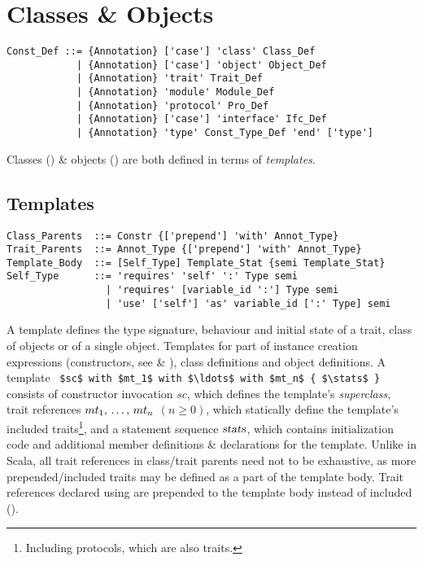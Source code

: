 
\chapter{Classes \& Objects}

\syntax\begin{lstlisting}
Const_Def ::= {Annotation} ['case'] 'class' Class_Def
            | {Annotation} ['case'] 'object' Object_Def
            | {Annotation} 'trait' Trait_Def
            | {Annotation} 'module' Module_Def
            | {Annotation} 'protocol' Pro_Def
            | {Annotation} ['case'] 'interface' Ifc_Def
            | {Annotation} 'type' Const_Type_Def 'end' ['type']
\end{lstlisting}

Classes () \& objects () are both defined in terms of {\em templates}. 





\section{Templates}
\label{sec:templates}

\syntax\begin{lstlisting}
Class_Parents  ::= Constr {['prepend'] 'with' Annot_Type} 
Trait_Parents  ::= Annot_Type {['prepend'] 'with' Annot_Type}
Template_Body  ::= [Self_Type] Template_Stat {semi Template_Stat}
Self_Type      ::= 'requires' 'self' ':' Type semi
                 | 'requires' [variable_id ':'] Type semi
                 | 'use' ['self'] 'as' variable_id [':' Type] semi
\end{lstlisting}

A template defines the type signature, behaviour and initial state of a trait, class of objects or of a single object. Templates for part of instance creation expressions (constructors, see  \& ), class definitions and object definitions. A template ~\lstinline!$sc$ with $mt_1$ with $\ldots$ with $mt_n$ { $\stats$ }!~ consists of constructor invocation $sc$, which defines the template's {\em superclass}, trait references $mt_1 ,\, \ldots ,\, mt_n$ $(n \geq 0)$, which statically define the template's included traits\footnote{Including protocols, which are also traits.}, and a statement sequence $\mbox{\sl stats}$, which contains initialization code and additional member definitions \& declarations for the template. Unlike in Scala, all trait references in class/trait parents need not to be exhaustive, as more prepended/included traits may be defined as a part of the template body. Trait references declared using  are prepended to the template body instead of included (). 


